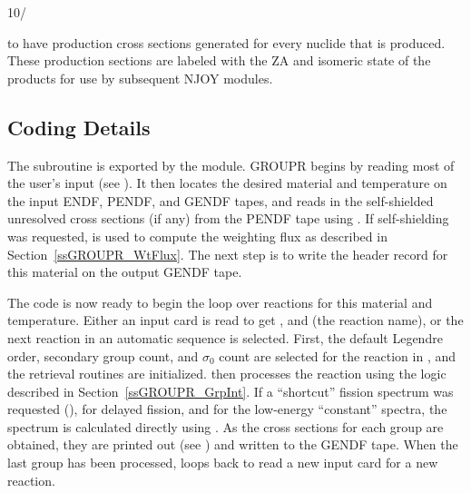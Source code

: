 \small
\begin{ccode}

 10/

\end{ccode}
\normalsize

\noindent
to have production cross sections generated for every nuclide that
is produced.  These production sections are labeled with the ZA and
isomeric state of the products for use by subsequent NJOY modules.


\subsection{Coding Details}
\label{ssGROUPR_details}

The  subroutine is exported
by the  module.
GROUPR begins by reading most of the user's input (see
).  It then
locates the desired material and temperature on the input ENDF,
PENDF, and GENDF tapes, and reads in
the self-shielded unresolved cross sections (if any) from the PENDF
tape using .  If
self-shielding was requested, 
is used to compute the weighting flux as described in
Section~\ref{ssGROUPR_WtFlux}.  The
next step is to write the header record for this material on the
output GENDF tape.

The code is now ready to begin the loop over reactions for this
material and temperature.  Either an input card is read to
get ,  and  (the reaction name),
or the next reaction in
an automatic sequence is selected.  First, the default Legendre order,
secondary group count, and $\sigma_0$ count are selected for the reaction
in , and the retrieval routines are
initialized.   then processes the reaction using the
 logic described in
Section~\ref{ssGROUPR_GrpInt}.  If a ``shortcut'' fission
spectrum was requested (), for delayed fission, and
for the low-energy ``constant'' spectra, the spectrum is calculated
directly using .  As the cross
sections for each group are obtained, they are printed out
(see ) and written to the
GENDF tape.  When the last group has been processed, 
loops back to read a new input card for a new reaction.

